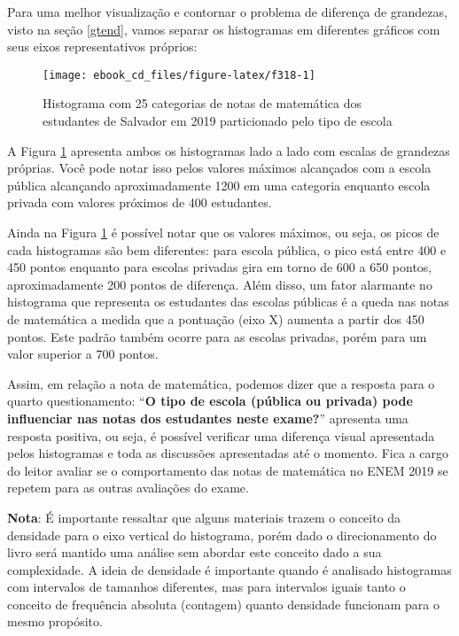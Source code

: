 \documentclass[
  oneside]{book}
\begin{document}
Para uma melhor visualização e contornar o problema de diferença de grandezas, visto na seção \ref{gtend}, vamos separar os histogramas em diferentes gráficos com seus eixos representativos próprios:

\begin{figure}

{\centering \texttt{[image: ebook\_cd\_files/figure-latex/f318-1]} 

}

\caption{Histograma com 25 categorias de notas de matemática dos estudantes de Salvador em 2019 particionado pelo tipo de escola}\label{fig:f318}
\end{figure}

A Figura \ref{fig:f318} apresenta ambos os histogramas lado a lado com escalas de grandezas próprias. Você pode notar isso pelos valores máximos alcançados com a escola pública alcançando aproximadamente 1200 em uma categoria enquanto escola privada com valores próximos de 400 estudantes.

Ainda na Figura \ref{fig:f318} é possível notar que os valores máximos, ou seja, os picos de cada histogramas são bem diferentes: para escola pública, o pico está entre 400 e 450 pontos enquanto para escolas privadas gira em torno de 600 a 650 pontos, aproximadamente 200 pontos de diferença. Além disso, um fator alarmante no histograma que representa os estudantes das escolas públicas é a queda nas notas de matemática a medida que a pontuação (eixo X) aumenta a partir dos 450 pontos. Este padrão também ocorre para as escolas privadas, porém para um valor superior a 700 pontos.

Assim, em relação a nota de matemática, podemos dizer que a resposta para o quarto questionamento: ``\textbf{O tipo de escola (pública ou privada) pode influenciar nas notas dos estudantes neste exame?}'' apresenta uma resposta positiva, ou seja, é possível verificar uma diferença visual apresentada pelos histogramas e toda as discussões apresentadas até o momento. Fica a cargo do leitor avaliar se o comportamento das notas de matemática no ENEM 2019 se repetem para as outras avaliações do exame.

\textbf{Nota}: É importante ressaltar que alguns materiais trazem o conceito da densidade para o eixo vertical do histograma, porém dado o direcionamento do livro será mantido uma análise sem abordar este conceito dado a sua complexidade. A ideia de densidade é importante quando é analisado histogramas com intervalos de tamanhos diferentes, mas para intervalos iguais tanto o conceito de frequência absoluta (contagem) quanto densidade funcionam para o mesmo propósito.
\end{document}
